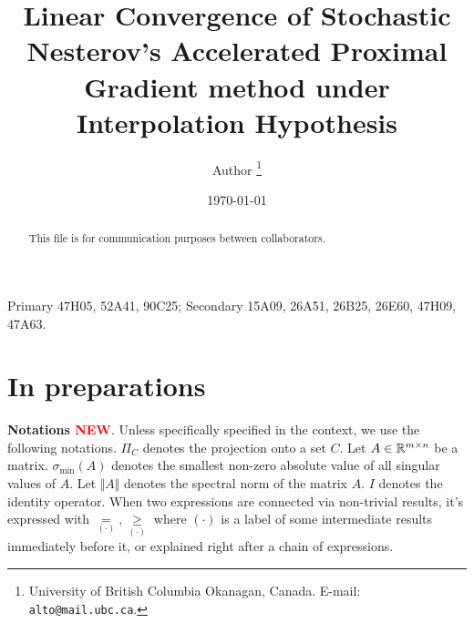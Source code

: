 \documentclass[12pt]{article}
\begin{document}
\title{{\selectfont Linear Convergence of Stochastic Nesterov's Accelerated Proximal Gradient method under Interpolation Hypothesis}}

\author{
    Author
    \thanks{
        University of British Columbia Okanagan,
        Canada. E-mail: \texttt{alto@mail.ubc.ca}.
    }
}

\date{\today}

\maketitle
{}

\begin{abstract} 
    This file is for communication purposes between collaborators. 

\end{abstract}

Primary 47H05, 52A41, 90C25; Secondary 15A09, 26A51, 26B25, 26E60, 47H09, 47A63.


\section{In preparations}
    \textbf{Notations \textcolor{red}{NEW}}. 
    Unless specifically specified in the context, we use the following notations. 
    $\Pi_C$ denotes the projection onto a set $C$. 
    Let $A \in \mathbb R^{m \times n}$ be a matrix. 
    $\sigma_{\min}(A)$ denotes the smallest non-zero absolute value of all singular values of $A$. 
    Let $\Vert A\Vert$ denotes the spectral norm of the matrix $A$. 
    $I$ denotes the identity operator. 
    When two expressions are connected via non-trivial results, it's expressed with $\underset{(\cdot)}{=}, \underset{(\cdot)}{\ge}$ where $(\cdot)$ is a label of some intermediate results immediately before it, or explained right after a chain of expressions. 
\end{document}

